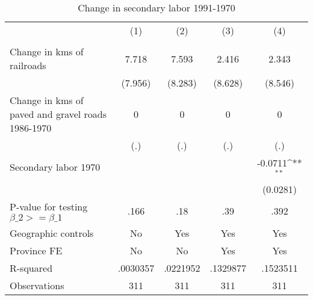 \begin{table}[htbp]\centering
\def\sym#1{\ifmmode^{#1}\else\(^{#1}\)\fi}
\caption{Change in secondary labor 1991-1970}
\begin{tabular}{l*{4}{c}}
\hline\hline
                &\multicolumn{1}{c}{(1)}&\multicolumn{1}{c}{(2)}&\multicolumn{1}{c}{(3)}&\multicolumn{1}{c}{(4)}\\
                &\multicolumn{1}{c}{}&\multicolumn{1}{c}{}&\multicolumn{1}{c}{}&\multicolumn{1}{c}{}\\
\hline
Change in kms of railroads&    7.718         &    7.593         &    2.416         &    2.343         \\
                &  (7.956)         &  (8.283)         &  (8.628)         &  (8.546)         \\
[1em]
Change in kms of paved and gravel roads 1986-1970&        0         &        0         &        0         &        0         \\
                &      (.)         &      (.)         &      (.)         &      (.)         \\
[1em]
Secondary labor 1970&                  &                  &                  &  -0.0711\sym{**} \\
                &                  &                  &                  & (0.0281)         \\
\hline
P-value for testing $\beta\_{2} >= \beta\_{1}$&     .166         &      .18         &      .39         &     .392         \\
Geographic controls&       No         &      Yes         &      Yes         &      Yes         \\
Province FE     &       No         &       No         &      Yes         &      Yes         \\
R-squared       & .0030357         & .0221952         & .1329877         & .1523511         \\
Observations    &      311         &      311         &      311         &      311         \\
\hline\hline
\end{tabular}
\end{table}
